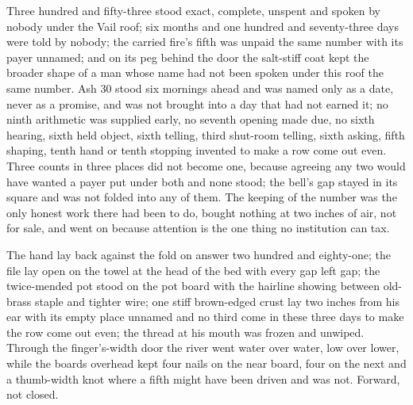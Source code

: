 Three hundred and fifty-three stood exact, complete, unspent and spoken by nobody under the Vail roof; six months and one hundred and seventy-three days were told by nobody; the carried fire's fifth was unpaid the same number with its payer unnamed; and on its peg behind the door the salt-stiff coat kept the broader shape of a man whose name had not been spoken under this roof the same number. Ash 30 stood six mornings ahead and was named only as a date, never as a promise, and was not brought into a day that had not earned it; no ninth arithmetic was supplied early, no seventh opening made due, no sixth hearing, sixth held object, sixth telling, third shut-room telling, sixth asking, fifth shaping, tenth hand or tenth stopping invented to make a row come out even. Three counts in three places did not become one, because agreeing any two would have wanted a payer put under both and none stood; the bell's gap stayed in its square and was not folded into any of them. The keeping of the number was the only honest work there had been to do, bought nothing at two inches of air, not for sale, and went on because attention is the one thing no institution can tax.

The hand lay back against the fold on answer two hundred and eighty-one; the file lay open on the towel at the head of the bed with every gap left gap; the twice-mended pot stood on the pot board with the hairline showing between old-brass staple and tighter wire; one stiff brown-edged crust lay two inches from his ear with its empty place unnamed and no third come in these three days to make the row come out even; the thread at his mouth was frozen and unwiped. Through the finger's-width door the river went water over water, low over lower, while the boards overhead kept four nails on the near board, four on the next and a thumb-width knot where a fifth might have been driven and was not. Forward, not closed.
